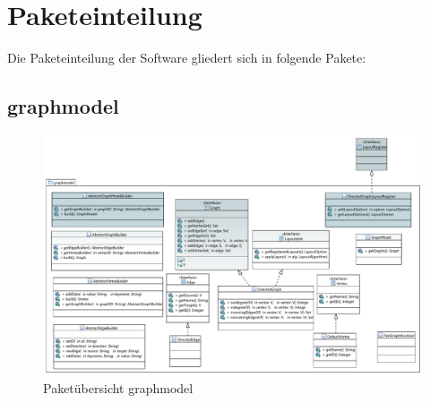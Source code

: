 \chapter{Paketeinteilung}
\label{ch:paketeinteilung}

Die Paketeinteilung der Software gliedert sich in folgende Pakete: %

\section{graphmodel}

\begin{figure}[hb]
  \centering
  \includegraphics[width=380pt]{resourcen/graphmodel.pdf}
  \caption{Paketübersicht graphmodel}
  \label{fig:packge_graphmodel}
\end{figure}

